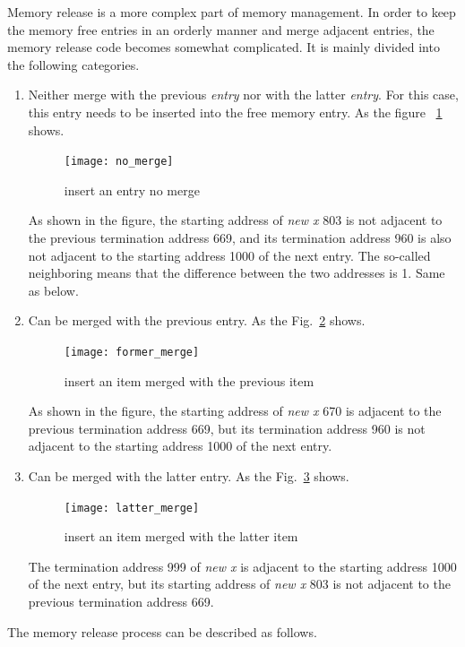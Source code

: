 \documentclass{swfcthesis}
\begin{document}
Memory release is a more complex part of memory management. In order to keep the memory
free entries in an orderly manner and merge adjacent entries, the memory release code
becomes somewhat complicated. It is mainly divided into the following categories.
\begin{enumerate}
\item Neither merge with the previous \emph{entry} nor with the latter \emph{entry}. For
  this case, this entry needs to be inserted into the free memory entry. As the figure
  ~\ref{fig:no-merge} shows.
  \begin{figure}[!ht]
    \centering
    \texttt{[image: no\_merge]}
    \caption{insert an entry no merge}
    \label{fig:no-merge}
  \end{figure}
  As shown in the figure, the starting address of \emph{new x} 803 is not adjacent to
  the previous termination address 669, and its termination address 960 is also not
  adjacent to the starting address 1000 of the next entry. The so-called neighboring means
  that the difference between the two addresses is 1. Same as below.

\item Can be merged with the previous entry. As the Fig.~\ref{fig:former-merge} shows.
  \begin{figure}[!ht]
    \centering
    \texttt{[image: former\_merge]}
    \caption{insert an item merged with the previous item}
    \label{fig:former-merge}
  \end{figure}
  As shown in the figure, the starting address of \emph{new x} 670 is adjacent to the
  previous termination address 669, but its termination address 960 is not adjacent to the
  starting address 1000 of the next entry.


\item Can be merged with the latter entry. As the Fig.~\ref{fig:latter-merge} shows.
  \begin{figure}[!ht]
    \centering
    \texttt{[image: latter\_merge]}
    \caption{insert an item merged with the latter item}
    \label{fig:latter-merge}
  \end{figure}
  The termination address 999 of \emph{new x} is adjacent to the starting address 1000
  of the next entry, but its starting address of \emph{new x} 803 is not adjacent to the
  previous termination address 669.
  
\end{enumerate}
The memory release process can be described as follows.
\end{document}
